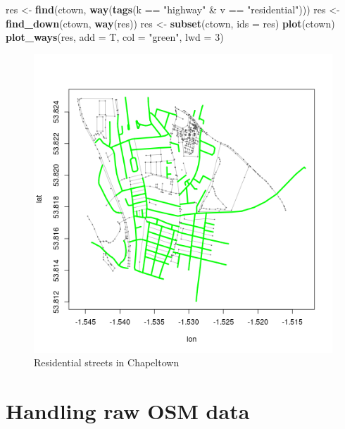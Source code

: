 \documentclass[]{article}
\newenvironment{Shaded}{}{}
\newcommand{\KeywordTok}[1]{\textcolor[rgb]{0.00,0.44,0.13}{\textbf{{#1}}}}
\newcommand{\DataTypeTok}[1]{\textcolor[rgb]{0.56,0.13,0.00}{{#1}}}
\newcommand{\DecValTok}[1]{\textcolor[rgb]{0.25,0.63,0.44}{{#1}}}
\newcommand{\StringTok}[1]{\textcolor[rgb]{0.25,0.44,0.63}{{#1}}}
\newcommand{\NormalTok}[1]{{#1}}
\begin{document}
\begin{Shaded}
\begin{Highlighting}[]
\NormalTok{res <-}\StringTok{ }\KeywordTok{find}\NormalTok{(ctown, }\KeywordTok{way}\NormalTok{(}\KeywordTok{tags}\NormalTok{(k ==}\StringTok{ "highway"} \NormalTok{&}\StringTok{ }\NormalTok{v ==}\StringTok{ "residential"}\NormalTok{)))}
\NormalTok{res <-}\StringTok{ }\KeywordTok{find_down}\NormalTok{(ctown, }\KeywordTok{way}\NormalTok{(res))}
\NormalTok{res <-}\StringTok{ }\KeywordTok{subset}\NormalTok{(ctown, }\DataTypeTok{ids =} \NormalTok{res)}
\KeywordTok{plot}\NormalTok{(ctown)}
\KeywordTok{plot_ways}\NormalTok{(res, }\DataTypeTok{add =} \NormalTok{T, }\DataTypeTok{col =} \StringTok{"green"}\NormalTok{, }\DataTypeTok{lwd =} \DecValTok{3}\NormalTok{)}
\end{Highlighting}
\end{Shaded}

\begin{figure}[htbp]
\centering
\includegraphics{figure/Residential_streets_in_Chapeltown.png}
\caption{Residential streets in Chapeltown}
\end{figure}

\section{Handling raw OSM data}\label{handling-raw-osm-data}
\end{document}
